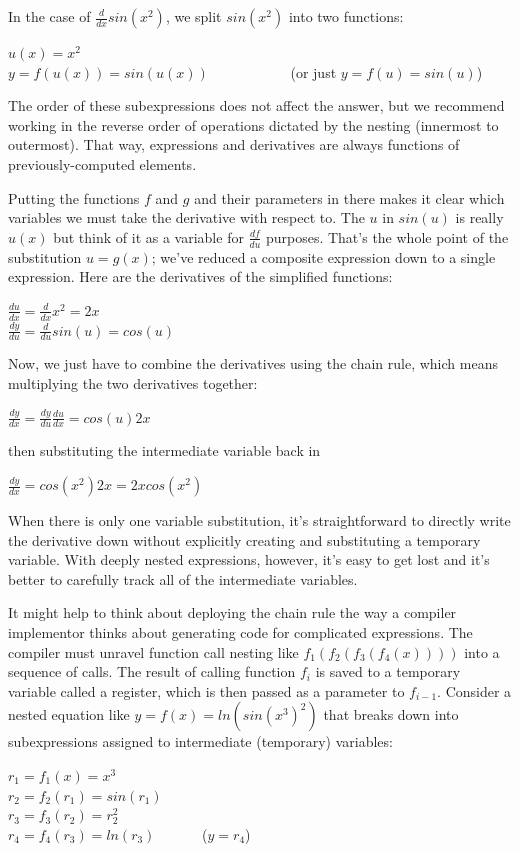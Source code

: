 \documentclass[11pt]{article}
\begin{document}
In the case of $\frac{d}{dx} sin(x^2)$, we split $sin(x^2)$ into two functions:

$u(x) = x^2$\\
$y = f(u(x)) = sin(u(x))$ ~~~~~~~~~~~(or just $y = f(u) = sin(u)$)

The order of these subexpressions does not affect the answer, but we recommend working in the reverse order of operations dictated by the nesting (innermost to outermost). That way, expressions and derivatives are always functions of previously-computed elements. 

Putting the functions $f$ and $g$ and their parameters in there makes it clear which variables we must take the derivative with respect to. The $u$ in $sin(u)$ is really $u(x)$ but think of it as a variable for $\frac{df}{du}$ purposes. That's the whole point of the substitution $u = g(x)$; we've reduced a composite expression down to a single expression. Here are the derivatives of the simplified functions:

$\frac{du}{dx} = \frac{d}{dx} x^2 = 2x$\\
$\frac{dy}{du} = \frac{d}{du} sin(u) = cos(u)$

Now, we just have to combine the derivatives using the chain rule, which means multiplying the two derivatives together:

$\frac{dy}{dx} = \frac{dy}{du} \frac{du}{dx} = cos(u) 2x$

then substituting the intermediate variable back in

$\frac{dy}{dx} = cos(x^2) 2x = 2xcos(x^2)$

When there is only one variable substitution, it's straightforward to directly write the derivative down without explicitly creating and substituting a temporary variable. With deeply nested expressions, however, it's easy to get lost and it's better to carefully track all of the intermediate variables.

It might help to think about deploying the chain rule the way a compiler implementor thinks about generating code for complicated expressions.  The compiler must unravel function call nesting like $f_1(f_2(f_3(f_4(x))))$ into a sequence of calls. The result of calling function $f_i$ is saved to a temporary variable called a register, which is then passed as a parameter to $f_{i-1}$.  Consider a nested equation like $y = f(x) = ln(sin(x^3)^2)$ that breaks down into subexpressions assigned to  intermediate (temporary) variables:

$r_1 = f_1(x) = x^3$\\
$r_2 = f_2(r_1) = sin(r_1)$\\
$r_3 = f_3(r_2) = r_2^2$\\
$r_4 = f_4(r_3) = ln(r_3)$ ~~~~~~($y = r_4$)
\end{document}
